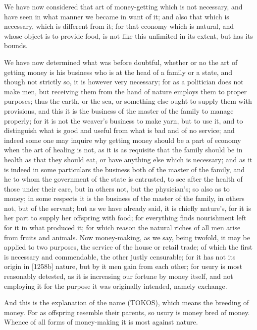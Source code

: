 We have now considered that art of money-getting which is not necessary,
and have seen in what manner we became in want of it; and also that which
is necessary, which is different from it; for that economy which is
natural, and whose object is to provide food, is not like this unlimited
in its extent, but has its bounds.


We have now determined what was before doubtful, whether or no the art of
getting money is his business who is at the head of a family or a state,
and though not strictly so, it is however very necessary; for as a
politician does not make men, but receiving them from the hand of nature
employs them to proper purposes; thus the earth, or the sea, or something
else ought to supply them with provisions, and this it is the business of
the master of the family to manage properly; for it is not the weaver's
business to make yarn, but to use it, and to distinguish what is good and
useful from what is bad and of no service; and indeed some one may inquire
why getting money should be a part of economy when the art of healing is
not, as it is as requisite that the family should be in health as that
they should eat, or have anything else which is necessary; and as it is
indeed in some particulars the business both of the master of the family,
and he to whom the government of the state is entrusted, to see after the
health of those under their care, but in others not, but the physician's;
so also as to money; in some respects it is the business of the master of
the family, in others not, but of the servant; but as we have already
said, it is chiefly nature's, for it is her part to supply her offspring
with food; for everything finds nourishment left for it in what produced
it; for which reason the natural riches of all men arise from fruits and
animals. Now money-making, as we say, being twofold, it may be applied to
two purposes, the service of the house or retail trade; of which the first
is necessary and commendable, the other justly censurable; for it has not
its origin in [1258b] nature, but by it men gain from each other; for
usury is most reasonably detested, as it is increasing our fortune by
money itself, and not employing it for the purpose it was originally
intended, namely exchange.

And this is the explanation of the name (TOKOS), which means the breeding
of money. For as offspring resemble their parents, so usury is money bred
of money. Whence of all forms of money-making it is most against nature.

